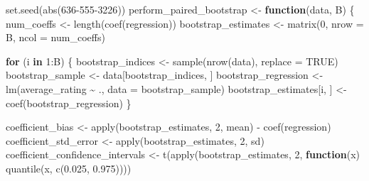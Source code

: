 \documentclass[
]{article}
\newenvironment{Shaded}{\begin{snugshade}}{\end{snugshade}}
\newcommand{\AttributeTok}[1]{\textcolor[rgb]{0.77,0.63,0.00}{#1}}
\newcommand{\ConstantTok}[1]{\textcolor[rgb]{0.00,0.00,0.00}{#1}}
\newcommand{\ControlFlowTok}[1]{\textcolor[rgb]{0.13,0.29,0.53}{\textbf{#1}}}
\newcommand{\DecValTok}[1]{\textcolor[rgb]{0.00,0.00,0.81}{#1}}
\newcommand{\FloatTok}[1]{\textcolor[rgb]{0.00,0.00,0.81}{#1}}
\newcommand{\FunctionTok}[1]{\textcolor[rgb]{0.00,0.00,0.00}{#1}}
\newcommand{\NormalTok}[1]{#1}
\newcommand{\OtherTok}[1]{\textcolor[rgb]{0.56,0.35,0.01}{#1}}
\newcommand{\SpecialCharTok}[1]{\textcolor[rgb]{0.00,0.00,0.00}{#1}}
\begin{document}
\begin{Shaded}
\begin{Highlighting}[]
\FunctionTok{set.seed}\NormalTok{(}\FunctionTok{abs}\NormalTok{(}\DecValTok{636{-}555{-}3226}\NormalTok{))}
\NormalTok{perform\_paired\_bootstrap }\OtherTok{\textless{}{-}} \ControlFlowTok{function}\NormalTok{(data, B) \{}
\NormalTok{  num\_coeffs }\OtherTok{\textless{}{-}} \FunctionTok{length}\NormalTok{(}\FunctionTok{coef}\NormalTok{(regression))}
\NormalTok{  bootstrap\_estimates }\OtherTok{\textless{}{-}} \FunctionTok{matrix}\NormalTok{(}\DecValTok{0}\NormalTok{, }\AttributeTok{nrow =}\NormalTok{ B, }\AttributeTok{ncol =}\NormalTok{ num\_coeffs)}
  
  \ControlFlowTok{for}\NormalTok{ (i }\ControlFlowTok{in} \DecValTok{1}\SpecialCharTok{:}\NormalTok{B) \{}
\NormalTok{    bootstrap\_indices }\OtherTok{\textless{}{-}} \FunctionTok{sample}\NormalTok{(}\FunctionTok{nrow}\NormalTok{(data), }\AttributeTok{replace =} \ConstantTok{TRUE}\NormalTok{)}
\NormalTok{    bootstrap\_sample }\OtherTok{\textless{}{-}}\NormalTok{ data[bootstrap\_indices, ]}
\NormalTok{    bootstrap\_regression }\OtherTok{\textless{}{-}} \FunctionTok{lm}\NormalTok{(average\_rating }\SpecialCharTok{\textasciitilde{}}\NormalTok{ ., }\AttributeTok{data =}\NormalTok{ bootstrap\_sample)}
\NormalTok{    bootstrap\_estimates[i, ] }\OtherTok{\textless{}{-}} \FunctionTok{coef}\NormalTok{(bootstrap\_regression)}
\NormalTok{  \}}
  
\NormalTok{  coefficient\_bias }\OtherTok{\textless{}{-}} \FunctionTok{apply}\NormalTok{(bootstrap\_estimates, }\DecValTok{2}\NormalTok{, mean) }\SpecialCharTok{{-}} \FunctionTok{coef}\NormalTok{(regression)}
\NormalTok{  coefficient\_std\_error }\OtherTok{\textless{}{-}} \FunctionTok{apply}\NormalTok{(bootstrap\_estimates, }\DecValTok{2}\NormalTok{, sd)}
\NormalTok{  coefficient\_confidence\_intervals }\OtherTok{\textless{}{-}} \FunctionTok{t}\NormalTok{(}\FunctionTok{apply}\NormalTok{(bootstrap\_estimates, }\DecValTok{2}\NormalTok{, }\ControlFlowTok{function}\NormalTok{(x) }\FunctionTok{quantile}\NormalTok{(x, }\FunctionTok{c}\NormalTok{(}\FloatTok{0.025}\NormalTok{, }\FloatTok{0.975}\NormalTok{))))}
  

\end{Highlighting}
\end{Shaded}
\end{document}
